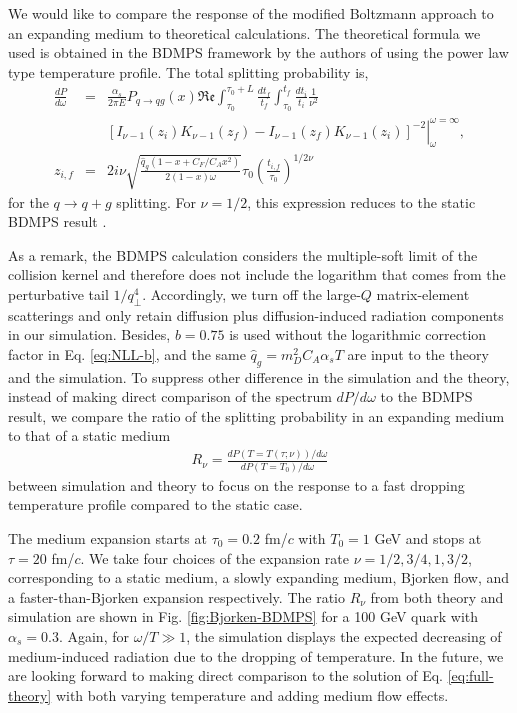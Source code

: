 \documentclass[aps, prc, reprint, amsmath, groupedaddress, nofootinbib]{revtex4-1}
\begin{document}
We would like to compare the response of the modified Boltzmann approach to an expanding medium to theoretical calculations.
The theoretical formula we used is obtained in the BDMPS framework 
by the authors of \cite{Baier:1998yf} using the power law type temperature profile. 
The total splitting probability is,
\begin{eqnarray}
\frac{dP}{d\omega} &=& \frac{\alpha_s}{2\pi E}P_{q\rightarrow qg}(x)\mathfrak{Re}\int_{\tau_0}^{\tau_0+L}\frac{dt_f}{t_f}\int_{\tau_0}^{t_f}\frac{dt_i}{t_i} \frac{1}{\nu^2}\\
\nonumber
&& \left.\left[ I_{\nu-1}(z_i)K_{\nu-1}(z_f)-I_{\nu-1}(z_f)K_{\nu-1}(z_i)\right]^{-2}\right|_{\omega}^{\omega=\infty},\\
z_{i,f} &=& 2i\nu \sqrt{\frac{\hat{q}_g(1-x+C_F/C_A x^2)}{2(1-x)\omega}} \tau_0 \left( \frac{t_{i,f}}{\tau_0}\right) ^{1/2\nu}
\end{eqnarray}
for the $q\rightarrow q+g$ splitting.
For $\nu=1/2$, this expression reduces to the static BDMPS result \cite{Baier:1996kr}. 

As a remark, the BDMPS calculation considers the multiple-soft limit of the collision kernel and therefore does not include the logarithm that comes from the perturbative tail $1/q_\perp^4$. 
Accordingly, we turn off the large-$Q$ matrix-element scatterings and only retain diffusion plus diffusion-induced radiation components in our simulation.
Besides, $b=0.75$ is used without the logarithmic correction factor in Eq. \ref{eq:NLL-b}, and the same $\hat{q}_g = m_D^2 C_A\alpha_s T$ are input to the theory and the simulation.
To suppress other difference in the simulation and the theory, instead of making direct comparison of the spectrum $dP/d\omega$ to the BDMPS result, we compare the ratio of the splitting probability in an expanding medium to that of a static medium
\begin{eqnarray}
R_\nu = \frac{dP(T=T(\tau;\nu))/d\omega}{dP(T=T_0)/d\omega}
\end{eqnarray}
between simulation and theory to focus on the response to a fast dropping temperature profile compared to the static case.

The medium expansion starts at $\tau_0=0.2$ fm/$c$ with $T_0=1$ GeV and stops at $\tau = 20$ fm/$c$.
We take four choices of the expansion rate $\nu = 1/2, 3/4, 1, 3/2$, corresponding to a static medium, a slowly expanding medium, Bjorken flow, and a faster-than-Bjorken expansion respectively.
The ratio $R_\nu$ from both theory and simulation are shown in Fig. \ref{fig:Bjorken-BDMPS} for a 100 GeV quark with $\alpha_s=0.3$.
Again, for $\omega/T \gg 1$, the simulation displays the expected decreasing of medium-induced radiation due to the dropping of temperature.
In the future, we are looking forward to making direct comparison to the solution of Eq. \ref{eq:full-theory} with both varying temperature and adding medium flow effects.
\end{document}
